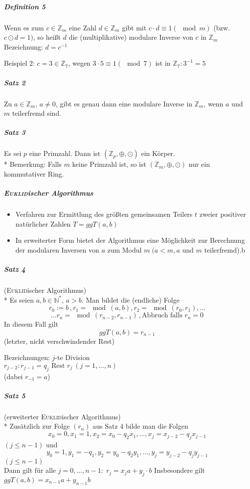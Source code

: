 \documentclass[a4paper]{scrartcl}
\begin{document}
\subparagraph{Definition 5} Wenn es zum $c \in \mathbb{Z}_m$ eine Zahl $d\in \mathbb{Z}_m$ gibt mit $c \cdot d \equiv 1 (\mod{m})$ (bzw. $ c \odot d =1)$, so heißt $d$ die (multiplikative) modulare Inverse von $c$ in $\mathbb{Z}_m$\\
Bezeichnung: $d=c^{-1}$

Beispiel 2: $c=3 \in \mathbb{Z}_7$, wegen $3 \cdot 5 \equiv 1 ( \mod{7})$ ist in $\mathbb{Z}_7: 3^{-1} = 5$

\subparagraph{Satz 2} Zu $a\in \mathbb{Z}_m,\, a\neq 0$, gibt es genau dann eine modulare Inverse in $\mathbb{Z}_m$, wenn $a$ und $m$ teilerfremd sind.

\subparagraph{Satz 3} Es sei $p$ eine Primzahl. Dann ist $(\mathbb{Z}_p,\oplus,\odot)$ ein Körper.\\*
Bemerkung: Falls $m$ keine Primzahl ist, so ist $(\mathbb{Z}_m,\oplus,\odot)$  nur ein kommutativer Ring.

\subparagraph{\textsc{Euklid}ischer Algorithmus}
\begin{itemize}
\item Verfahren zur Ermittlung des größten gemeinsamen Teilers $t$ zweier positiver natürlicher Zahlen $T=ggT(a,b)$
\item In erweiterter Form bietet der Algorithmus eine Möglichkeit zur Berechnung der modularen Inversen von $a$ zum Modul $m \; (a < m, a \text{ und } m$ teilerfremd).b
\end{itemize}

\subparagraph{Satz 4} (\textsc{Euklid}ischer Algorithmus)\\*
Es seien $a,b \in \mathbb{N}^*,\, a >b$. Man bildet die (endliche) Folge
\[ r_0 := b\, , r_1=\mod{(a,b)}, r_2=\mod{(r_0,r_1)},...\]
\[... r_n=\mod{(r_{n-2},r_{n-1})}\, ,\text{Abbruch falls } r_n=0\]
In diesem Fall gilt
\[ggT(a,b)=r_{n-1}\]
(letzter, nicht verschwindender Rest)

Bezeichnungen: $j$-te Division\\
$r_{j-2}: r_{j-1} = q_j \text{ Rest } r_j \: (j=1,...,n)$ \\
(dabei $r_{-1}=a$)

\subparagraph{Satz 5} (erweiterter \textsc{Euklid}ischer Algorithmus)\\*
Zusätzlich zur Folge $(r_n)$ aus Satz 4 bilde man die Folgen \[x_0 = 0, x_1 =1, x_2 = x_0 - q_2x_1,...,x_j=x_{j-2} - q_j x_{j-1}\]
$(j\leq n-1)$ und
\[y_0=1, y_1=-q_1,y_2=y_0-q_2y_1,...,y_j=y_{j-2}-q_jy_{j-1}\]
$(j\leq n-1)$\\
Dann gilt für alle $j=0,...,n-1: \; r_j=x_j a + y_j\cdot b$
Insbesondere gilt $ggT(a,b)=x_{n-1}a + y_{n-1}b$
\end{document}
